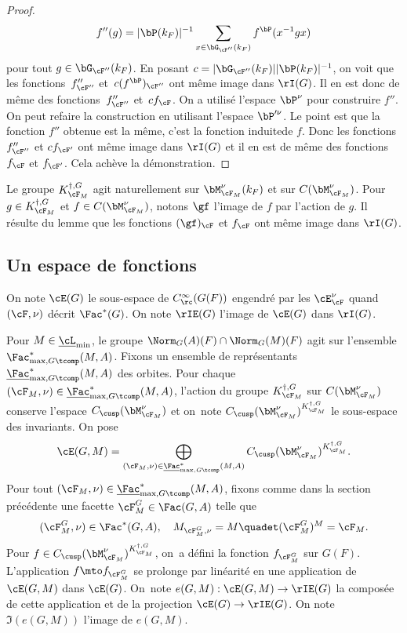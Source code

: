 \begin{proof}
\[
f''(g)=\vert \bP(k_{F})\vert ^{-1}\sum_{x\in \bG_{\cF''}(k_{F})}f^{\bP}(x^{-1}gx)
\]
pour tout $g\in \bG_{\cF''}(k_{F})$. En posant $c=\vert \bG_{\cF''}(k_{F})\vert \vert \bP(k_{F})\vert ^{-1}$, on voit que les \hbox{fonctions~$f''_{\cF''}$} et~$c(f^{\bP})_{\cF''}$ ont même image dans $\rI(G)$. Il en est donc de même des fonctions~$f''_{\cF''}$ et~$cf_{\cF}$. On a utilisé l'espace $\bP^{\nu}$ pour construire $f''$. On peut refaire la construction en utilisant l'espace $\bP^{\prime\nu}$. Le point est que la fonction $f''$ obtenue est la même, c'est la fonction \og induite\fg de $f$. Donc les fonctions $f''_{\cF''}$ et $cf_{\cF'}$ ont même image dans $\rI(G)$ et il en est de même des fonctions $f_{\cF}$ et $f_{\cF'}$. Cela achève la démonstration.
\end{proof}

\begin{rem*}
Le groupe $ K_{\cF_{M}}^{\dag,G}$ agit naturellement sur $\bM_{\cF_{M}}^{\nu}(k_{F})$ et sur $C(\bM_{\cF_{M}}^{\nu})$. Pour $g\in K_{\cF_{M}}^{\dag,G}$ et $f\in C(\bM_{\cF_{M}}^{\nu})$, notons $\gf$ l'image de $f$ par l'action de $g$. Il résulte du lemme que les fonctions $(\gf)_{\cF}$ et $f_{\cF}$ ont même image dans $\rI(G)$.
\end{rem*}

\subsection{Un espace de fonctions}\label{unespacedefonctions}

On note $\cE(G)$ le sous-espace de $C_{\rc}^{\infty}(G(F))$ engendré par les $\cE_{\cF}^{\nu}$ quand $(\cF,\nu)$ décrit $\Fac^*(G)$. On note $\rIE(G)$ l'image de $\cE(G)$ dans $\rI(G)$.

Pour $M\in \underline{\cL}_{\min}$, le groupe $\Norm_{G}(A)(F)\cap \Norm_{G}(M)(F)$ agit sur l'ensemble $\Fac^*_{\max,G\tcomp}(M,A)$. Fixons un ensemble de représentants $ \underline{\Fac}^*_{\max,G\tcomp}(M,A)$ des orbites. Pour chaque $(\cF_{M},\nu)\in \underline{\Fac}^*_{\max,G\tcomp}(M,A)$, l'action du groupe $K_{\cF_{M}}^{\dag,G}$ sur $C(\bM_{\cF_{M}}^{\nu})$ conserve l'espace $C_{\cusp}(\bM^{\nu}_{\cF_{M}})$ et on~note $C_{\cusp}(\bM^{\nu}_{\cF_{M}})^{K_{\cF_{M}}^{\dag,G}}$ le sous-espace des invariants.
On pose
\[
\cE(G,M)=\bigoplus_{(\cF_{M},\nu)\in \underline{\Fac}^*_{\max,G\tcomp}(M,A)}C_{\cusp}(\bM^{\nu}_{\cF_{M}})^{K_{\cF_{M}}^{\dag,G}}.
\]
Pour tout $(\cF_{M},\nu)\in \underline{\Fac}^*_{\max,G\tcomp}(M,A)$, fixons comme dans la section précédente une facette $\cF_{M}^G\in \Fac(G,A)$ telle que
\[
(\cF_{M}^G,\nu)\in \Fac^*(G,A),\quad M_{\cF_{M}^G,\nu}=M\quadet (\cF_{M}^G)^M=\cF_{M}.
\]
Pour $f\in C_{\cusp}(\bM^{\nu}_{\cF_{M}})^{K_{\cF_{M}}^{\dag,G}}$, on~a défini la fonction $f_{\cF_{M}^G}$ sur $G(F)$. L'application $f\mto f_{\cF_{M}^G}$ se prolonge par linéarité en une application de $\cE(G,M)$ dans $\cE(G)$.
On~note $e(G,M):\cE(G,M)\to \rIE(G)$ la composée de cette application et de la projection $\cE(G)\to \rIE(G)$. On note $ \Im(e(G,M))$ l'image de $e(G,M)$.

